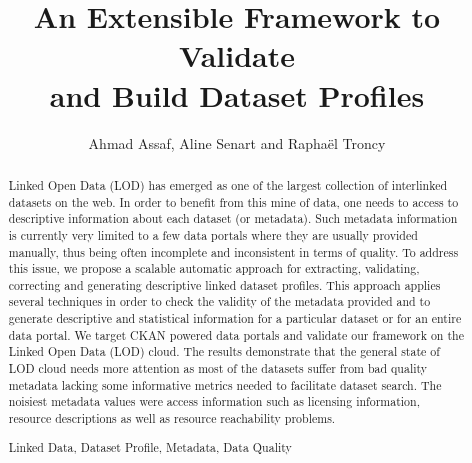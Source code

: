 \documentclass[runningheads,a4paper]{llncs}
\newcommand{\keywords}[1]{\par\addvspace\baselineskip
\noindent\keywordname\enspace\ignorespaces#1}
\begin{document}
\title{An Extensible Framework to Validate\\ and Build Dataset Profiles}

\author{Ahmad Assaf, Aline Senart and Rapha\"{e}l Troncy }



\maketitle


\begin{abstract}
Linked Open Data (LOD) has emerged as one of the largest collection of interlinked datasets on the web. In order to benefit from this mine of data, one needs to access to descriptive information about each dataset (or metadata). Such metadata information is currently very limited to a few data portals where they are usually provided manually, thus being often incomplete and inconsistent in terms of quality. To address this issue, we propose a scalable automatic approach for extracting, validating, correcting and generating descriptive linked dataset profiles. This approach applies several techniques in order to check the validity of the metadata provided and to generate descriptive and statistical information for a particular dataset or for an entire data portal. We target CKAN powered data portals and validate our framework on the Linked Open Data (LOD) cloud. The results demonstrate that the general state of LOD cloud needs more attention as most of the datasets suffer from bad quality metadata lacking some informative metrics needed to facilitate dataset search. The noisiest metadata values were access information such as licensing information, resource descriptions as well as resource reachability problems.
\keywords{Linked Data, Dataset Profile, Metadata, Data Quality}
\end{abstract}

\end{document}
